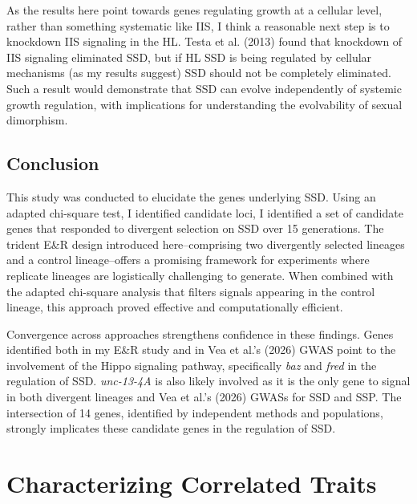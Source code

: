 \documentclass[12pt,reqno,oneside]{report}
\begin{document}
As the results here point towards genes regulating growth at a cellular level, rather than something systematic like IIS, I think a reasonable next step is to knockdown IIS signaling in the HL. Testa et al. (2013) found that knockdown of IIS signaling eliminated SSD, but if HL SSD is being regulated by cellular mechanisms (as my results suggest) SSD should not be completely eliminated. Such a result would demonstrate that SSD can evolve independently of systemic growth regulation, with implications for understanding the evolvability of sexual dimorphism.

\section{Conclusion}

This study was conducted to elucidate the genes underlying SSD. Using an adapted chi-square test, I identified candidate loci, I identified a set of candidate genes that responded to divergent selection on SSD over 15 generations. The trident E\&R design introduced here--comprising two divergently selected lineages and a control lineage--offers a promising framework for experiments where replicate lineages are logistically challenging to generate. When combined with the adapted chi-square analysis that filters signals appearing in the control lineage, this approach proved effective and computationally efficient. 

Convergence across approaches strengthens confidence in these findings. Genes identified both in my E\&R study and in Vea et al.'s (2026) GWAS point to the involvement of the Hippo signaling pathway, specifically \textit{baz} and \textit{fred} in the regulation of SSD. \textit{unc-13-4A} is also likely involved as it is the only gene to signal in both divergent lineages and Vea et al.'s (2026) GWASs for SSD and SSP. The intersection of 14 genes, identified by independent methods and populations, strongly implicates these candidate genes in the regulation of SSD.

\clearpage

\chapter{Characterizing Correlated Traits}
\end{document}
